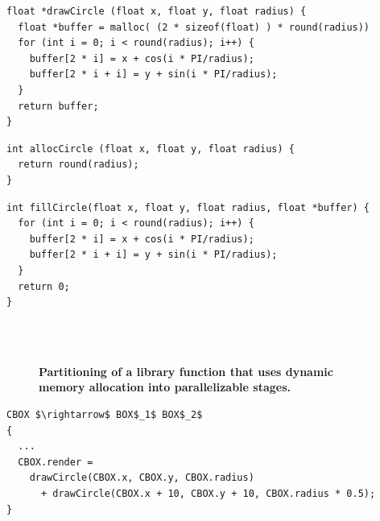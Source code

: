\newsavebox{\stagedAllocFull}
\begin{lrbox}{\stagedAllocFull}%
\begin{lstlisting}[mathescape]
float *drawCircle (float x, float y, float radius) {
  float *buffer = malloc( (2 * sizeof(float) ) * round(radius))
  for (int i = 0; i < round(radius); i++) {
    buffer[2 * i] = x + cos(i * PI/radius);
    buffer[2 * i + i] = y + sin(i * PI/radius);
  }
  return buffer;
}
\end{lstlisting}
\end{lrbox}

\newsavebox{\stagedAllocAlloc}
\begin{lrbox}{\stagedAllocAlloc}%
\begin{lstlisting}[mathescape]
int allocCircle (float x, float y, float radius) {
  return round(radius);
}
\end{lstlisting}
\end{lrbox}


\newsavebox{\stagedAllocRender}
\begin{lrbox}{\stagedAllocRender}%
\begin{lstlisting}[mathescape]
int fillCircle(float x, float y, float radius, float *buffer) {
  for (int i = 0; i < round(radius); i++) {
    buffer[2 * i] = x + cos(i * PI/radius);
    buffer[2 * i + i] = y + sin(i * PI/radius);
  }	
  return 0;
}
\end{lstlisting}
\end{lrbox}


\begin{figure}
  \\
 \\
\caption{\textbf{Partitioning of a library function that uses dynamic memory allocation into parallelizable stages.}}
\label{fig:stagedalloc}
\end{figure}


\newsavebox{\twocirclesOrig}
\begin{lrbox}{\twocirclesOrig}%
\begin{lstlisting}[mathescape]
CBOX $\rightarrow$ BOX$_1$ BOX$_2$
{
  ...
  CBOX.render = 
    drawCircle(CBOX.x, CBOX.y, CBOX.radius)
      + drawCircle(CBOX.x + 10, CBOX.y + 10, CBOX.radius * 0.5);
}
\end{lstlisting}
\end{lrbox}

